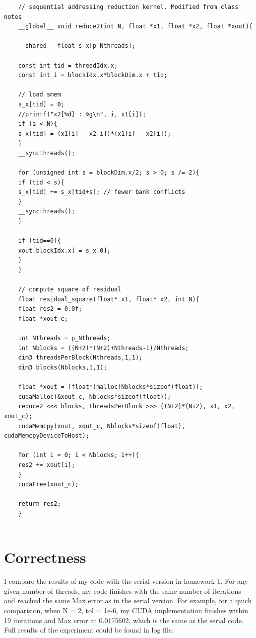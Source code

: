 \documentclass{amsart} %
\begin{document}
\begin{lstlisting}
	// sequential addressing reduction kernel. Modified from class notes  
	__global__ void reduce2(int N, float *x1, float *x2, float *xout){
	
	__shared__ float s_x[p_Nthreads];
	
	const int tid = threadIdx.x;
	const int i = blockIdx.x*blockDim.x + tid;
	
	// load smem
	s_x[tid] = 0;
	//printf("x2[%d] : %g\n", i, x1[i]);
	if (i < N){
	s_x[tid] = (x1[i] - x2[i])*(x1[i] - x2[i]);
	}
	__syncthreads();
	
	for (unsigned int s = blockDim.x/2; s > 0; s /= 2){
	if (tid < s){
	s_x[tid] += s_x[tid+s]; // fewer bank conflicts
	}
	__syncthreads();
	}   
	
	if (tid==0){
	xout[blockIdx.x] = s_x[0];
	}
	}
	
	// compute square of residual
	float residual_square(float* x1, float* x2, int N){
	float res2 = 0.0f; 
	float *xout_c;
	
	int Nthreads = p_Nthreads; 
	int Nblocks = ((N+2)*(N+2)+Nthreads-1)/Nthreads; 
	dim3 threadsPerBlock(Nthreads,1,1);  
	dim3 blocks(Nblocks,1,1);
	
	float *xout = (float*)malloc(Nblocks*sizeof(float));
	cudaMalloc(&xout_c, Nblocks*sizeof(float));
	reduce2 <<< blocks, threadsPerBlock >>> ((N+2)*(N+2), x1, x2, xout_c);
	cudaMemcpy(xout, xout_c, Nblocks*sizeof(float), cudaMemcpyDeviceToHost);
	
	for (int i = 0; i < Nblocks; i++){
	res2 += xout[i];
	}
	cudaFree(xout_c);
	
	return res2; 
	}
	
\end{lstlisting}



\section{Correctness}

I compare the results of my code with the serial version in homework 1. For any given number of threads, my code finishes with the same number of iterations and reached the same Max error as in the serial version. For example, for a quick comparision, when N = 2, tol = 1e-6, my CUDA implementation finishes within 19 iterations and Max error at 0.0175602, which is the same as the serial code. Full results of the experiment could be found in log file.  
\end{document}

